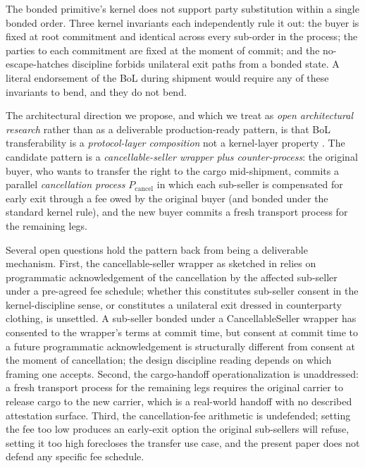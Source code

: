 \documentclass[11pt,a4paper]{article}
\theoremstyle{definition}
\theoremstyle{remark}
\begin{document}
The bonded primitive's kernel does not support party substitution
within a single bonded order. Three kernel invariants each
independently rule it out: the buyer is fixed at root commitment
and identical across every sub-order in the process; the parties
to each commitment are fixed at the moment of commit; and the
no-escape-hatches discipline forbids unilateral exit paths from a
bonded state. A literal endorsement of the BoL during shipment
would require any of these invariants to bend, and they do not
bend.

The architectural direction we propose, and which we treat as
\emph{open architectural research} rather than as a deliverable
production-ready pattern, is that BoL transferability is a
\emph{protocol-layer composition} not a kernel-layer property
\citep{bol_research_2026}. The candidate pattern is a
\emph{cancellable-seller wrapper plus counter-process}: the
original buyer, who wants to transfer the right to the cargo
mid-shipment, commits a parallel \emph{cancellation process}
$P_{\text{cancel}}$ in which each sub-seller is compensated for
early exit through a fee owed by the original buyer (and bonded
under the standard kernel rule), and the new buyer commits a
fresh transport process for the remaining legs.

Several open questions hold the pattern back from being a
deliverable mechanism. First, the cancellable-seller wrapper as
sketched in \citet{bol_research_2026} relies on programmatic
acknowledgement of the cancellation by the affected sub-seller
under a pre-agreed fee schedule; whether this constitutes
sub-seller consent in the kernel-discipline sense, or
constitutes a unilateral exit dressed in counterparty clothing,
is unsettled. A sub-seller bonded under a CancellableSeller
wrapper has consented to the wrapper's terms at commit time,
but consent at commit time to a future programmatic
acknowledgement is structurally different from consent at the
moment of cancellation; the design discipline reading depends
on which framing one accepts. Second, the cargo-handoff
operationalization is unaddressed: a fresh transport process
for the remaining legs requires the original carrier to release
cargo to the new carrier, which is a real-world handoff with no
described attestation surface. Third, the cancellation-fee
arithmetic is undefended; setting the fee too low produces an
early-exit option the original sub-sellers will refuse, setting
it too high forecloses the transfer use case, and the
present paper does not defend any specific fee schedule.
\end{document}
